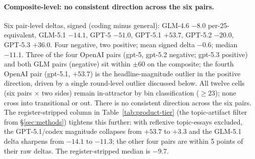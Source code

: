 \documentclass[11pt,a4paper]{article}
\begin{document}
\begin{sloppypar}
\paragraph{Composite-level: no consistent direction across the six pairs.} Six pair-level deltas, signed (coding minus general): GLM-4.6 $-8.0$ per-25-equivalent, GLM-5.1 $-14.1$, GPT-5 $-51.0$, GPT-5.1 $+53.7$, GPT-5.2 $-20.0$, GPT-5.3 $+36.0$. Four negative, two positive; mean signed delta $-0.6$; median $-11.1$. Three of the four OpenAI pairs (gpt-5, gpt-5.2 negative; gpt-5.3 positive) and both GLM pairs (negative) sit within $\pm 60$ on the composite; the fourth OpenAI pair (gpt-5.1, $+53.7$) is the headline-magnitude outlier in the positive direction, driven by a single round-level outlier discussed below. All twelve cells (six pairs $\times$ two sides) remain in-attractor by bin classification ($\ge 23$); none cross into transitional or out. There is no consistent direction across the six pairs. The register-stripped column in Table~\ref{tab:product-tier} (the topic-artifact filter from \S\ref{sec:methods}) tightens this further: with reflexive topic-essays excluded, the GPT-5.1/codex magnitude collapses from $+53.7$ to $+3.3$ and the GLM-5.1 delta sharpens from $-14.1$ to $-11.3$; the other four pairs are within 5 points of their raw deltas. The register-stripped median is $-9.7$.
\end{sloppypar}
\end{document}
